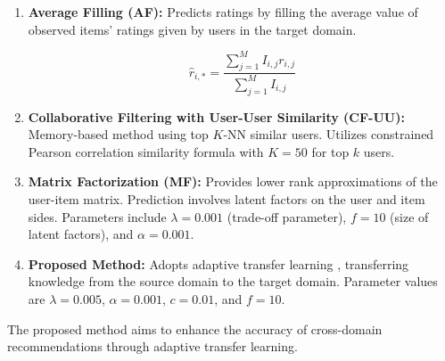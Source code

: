 \documentclass{article}
\begin{document}
\begin{enumerate}
    \item \textbf{Average Filling (AF):}
    Predicts ratings by filling the average value of observed items' ratings given by users in the target domain.
    
    \[
    \hat{r}_{i, *} = \frac{\sum_{j=1}^{M} I_{i, j} r_{i, j}}{\sum_{j=1}^{M} I_{i, j}}
    \]

    \item \textbf{Collaborative Filtering with User-User Similarity (CF-UU):}
    Memory-based method using top $K$-NN similar users. Utilizes constrained Pearson correlation similarity formula with $K = 50$ for top $k$ users.

    \item \textbf{Matrix Factorization (MF):}
    Provides lower rank approximations of the user-item matrix. Prediction involves latent factors on the user and item sides. Parameters include $\lambda = 0.001$ (trade-off parameter), $f = 10$ (size of latent factors), and $\alpha = 0.001$.

    \item \textbf{Proposed Method:}
    Adopts adaptive transfer learning \cite{transfer-learning} \cite{adaptive-transfer-learning}, transferring knowledge from the source domain to the target domain. Parameter values are $\lambda = 0.005$, $\alpha = 0.001$, $c = 0.01$, and $f = 10$.
\end{enumerate}

The proposed method aims to enhance the accuracy of cross-domain recommendations through adaptive transfer learning.
\end{document}
